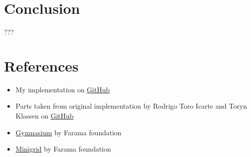\documentclass[12pt, a4paper]{article}
\begin{document}
\section*{Conclusion}

???

\section*{References}

\begin{itemize}
	\item My implementation on \href{https://github.com/maxstollmayer/Reward-Machines}{GitHub}
	\item Parts taken from original implementation by Rodrigo Toro Icarte and Toryn Klassen on \href{https://github.com/RodrigoToroIcarte/reward_machines}{GitHub}
	\item \href{https://gymnasium.farama.org/}{Gymnasium} by Farama foundation
	\item \href{https://minigrid.farama.org/environments/minigrid/DoorKeyEnv/}{Minigrid} by Farama foundation
\end{itemize}
\end{document}
